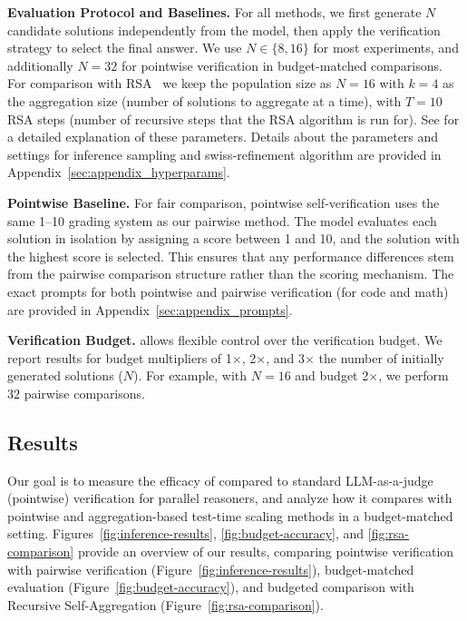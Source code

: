 \textbf{Evaluation Protocol and Baselines.} For all methods, we first generate $N$ candidate solutions independently from the model, then apply the verification strategy to select the final answer. We use $N \in \{8, 16\}$ for most experiments, and additionally $N=32$ for pointwise verification in budget-matched comparisons. For comparison with RSA~\citep{venkatraman2025recursiveselfaggregationunlocksdeep} we keep the population size as $N=16$ with $k=4$ as the aggregation size (number of solutions to aggregate at a time), with $T=10$ RSA steps (number of recursive steps that the RSA algorithm is run for). See \citet{venkatraman2025recursiveselfaggregationunlocksdeep} for a detailed explanation of these parameters. Details about the parameters and settings for inference sampling and swiss-refinement algorithm are provided in Appendix~\ref{sec:appendix_hyperparams}.

\textbf{Pointwise Baseline.} For fair comparison, pointwise self-verification uses the same 1--10 grading system as our pairwise method. The model evaluates each solution in isolation by assigning a score between 1 and 10, and the solution with the highest score is selected. This ensures that any performance differences stem from the pairwise comparison structure rather than the scoring mechanism. The exact prompts for both pointwise and pairwise verification (for code and math) are provided in Appendix~\ref{sec:appendix_prompts}.

\textbf{Verification Budget.} \pairinfer{} allows flexible control over the verification budget. We report results for budget multipliers of 1$\times$, 2$\times$, and 3$\times$ the number of initially generated solutions ($N$). For example, with $N=16$ and budget 2$\times$, we perform 32 pairwise comparisons.


\subsection{Results}

Our goal is to measure the efficacy of \pairinfer{} compared to standard LLM-as-a-judge (pointwise) verification for parallel reasoners, and analyze how it compares with pointwise and aggregation-based test-time scaling methods in a budget-matched setting. Figures~\ref{fig:inference-results}, \ref{fig:budget-accuracy}, and \ref{fig:rsa-comparison} provide an overview of our results, comparing pointwise verification with pairwise verification (Figure~\ref{fig:inference-results}), budget-matched evaluation (Figure~\ref{fig:budget-accuracy}), and budgeted comparison with Recursive Self-Aggregation (Figure~\ref{fig:rsa-comparison}).


